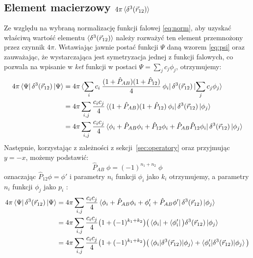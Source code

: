 \documentclass[a4paper,12pt]{article}
\numberwithin{equation}{section}
\numberwithin{table}{section}
\numberwithin{figure}{section}
\begin{document}
\subsection{Element macierzowy $4\pi\braket{\delta^3(\vec{r}_{12})}$}
Ze względu na wybraną normalizację funkcji falowej \eqref{eq:norm}, aby uzyskać właściwą wartość elementu $\braket{\delta^3(\vec{r}_{12})}$ należy rozważyć ten element przemnożony przez czynnik $4\pi$. Wstawiając jawnie postać funkcji $\Psi$ daną wzorem \eqref{eq:psi} oraz zauważając, że wystarczająca jest symetryzacja jednej z funkcji falowych, co pozwala na wpisanie w \emph{ket} funkcji w postaci $\Psi = \sum_j c_j \phi_j$, otrzymujemy:
\begin{equation}
\begin{split}
4\pi \bra{\Psi}\delta^3(\vec{r}_{12})\ket{\Psi} & = 4\pi \bra{ \sum_i c_i \: \frac{(1+\hat{P}_{AB})(1+\hat{P}_{12})}{4}\: \phi_i}\delta^3(\vec{r}_{12})\ket{\sum_j c_j  \phi_j}  \\ 
 & = 4\pi\sum_{i,j} \frac{c_i c_j}{4} \bra{(1+\hat{P}_{AB})(1+\hat{P}_{12})\: \phi_i}\delta^3(\vec{r}_{12})\ket{\phi_j}\\
 & = 4\pi\sum_{i,j} \frac{c_i c_j}{4}\bra{\phi_i + \hat{P}_{AB}\phi_i + \hat{P}_{12}\phi_i +\hat{P}_{AB}\hat{P}_{12}\phi_i}\delta^3(\vec{r}_{12})\ket{\phi_j}
\end{split}
\end{equation}
Następnie, korzystając z zależności z sekcji~\ref{sec:operatory} oraz przyjmując $y=-x$, możemy podstawić:
\begin{equation*}
\hat{P}_{AB}\; \phi = (-1)^{n_1+n_2}\;\phi
\end{equation*}
oznaczając $\hat{P}_{12} \phi = \phi'$ i parametry $n_i$ funkcji $\phi_i$ jako $k_i$ otrzymujemy, a parametry $n_i$ funkcji $\phi_j$ jako $p_i$ :
\begin{equation}
\begin{split}
4\pi \bra{\Psi}\delta^3(\vec{r}_{12})\ket{\Psi} & = 4 \pi \sum_{i,j} \frac{c_i c_j}{4} \bra{\phi_i + \hat{P}_{AB} \phi_{i} + \phi_{i}' + \hat{P}_{AB} \phi'}\delta^3(\vec{r}_{12})\ket{\phi_j}\\
 & = 4 \pi \sum_{i,j} \frac{c_i c_j}{4}\big( 1 + (-1)^{k_1+k_2}\big) \big( \bra{\phi_i} + \bra{\phi_{i}'}\big)\delta^3(\vec{r}_{12})\ket{\phi_j} \\
 & = 4 \pi \sum_{i,j} \frac{c_i c_j}{4}\big( 1 + (-1)^{k_1+k_2}\big) \big(\braket{\phi_i |\delta^3(\vec{r}_{12})| \phi_j} +\braket{\phi_{i}' |\delta^3(\vec{r}_{12})| \phi_j}\big)
\end{split}
\end{equation}
\end{document}
